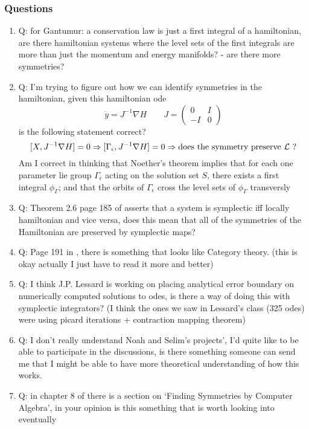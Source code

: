 \documentclass[12pt]{article}
\begin{document}
\subsubsection{Questions}
\begin{enumerate}
    \item Q: for Gantumur: a conservation law is just a first integral of a hamiltonian, are there hamiltonian systems where the level sets of the first integrals are more than just the momentum and energy manifolds? - are there more symmetries?

    \item Q: I'm trying to figure out how we can identify symmetries in the hamiltonian, given this hamiltonian ode
    $$\dot y = J^{-1}\nabla H\qquad J = \begin{pmatrix}0&I\\-I&0\end{pmatrix}$$
    is the following statement correct?
    $$
    [X , J^{-1}\nabla H] = 0 \Rightarrow [\Gamma_\epsilon , J^{-1}\nabla H] = 0 \Rightarrow \text{does the symmetry preserve $\mathcal L$ ?}
    $$
    Am I correct in thinking that Noether's theorem implies that for each one parameter lie group $\Gamma_\epsilon$ acting on the solution set $S$, there exists a first integral $\phi_\Gamma$; and that the orbits of $\Gamma_\epsilon$ cross the level sets of $\phi_\Gamma$ transversly
    
    \item Q: Theorem 2.6 page 185 of \cite{Numerical} asserts that a system is symplectic iff locally hamiltonian and vice versa, does this mean that all of the symmetries of the Hamiltonian are preserved by symplectic maps?
    
    \item Q: Page 191 in \cite{Numerical}, there is something that looks like Category theory. (this is okay actually I just have to read it more and better)
    
    \item Q: I think J.P. Lessard is working on placing analytical error boundary on numerically computed solutions to odes, is there a way of doing this with symplectic integrators? (I think the ones we saw in Lessard's class (325 odes) were using picard iterations + contraction mapping theorem)
    
    \item Q: I don't really understand Noah and Selim's projects', I'd quite like to be able to participate in the discussions, is there something someone can send me that I might be able to have more theoretical understanding of how this works. 
    
    \item Q: in chapter 8 of \cite{Symmetry-methods} there is a section on `Finding Symmetries by Computer Algebra', in your opinion is this something that is worth looking into eventually


\end{enumerate}
\end{document}
